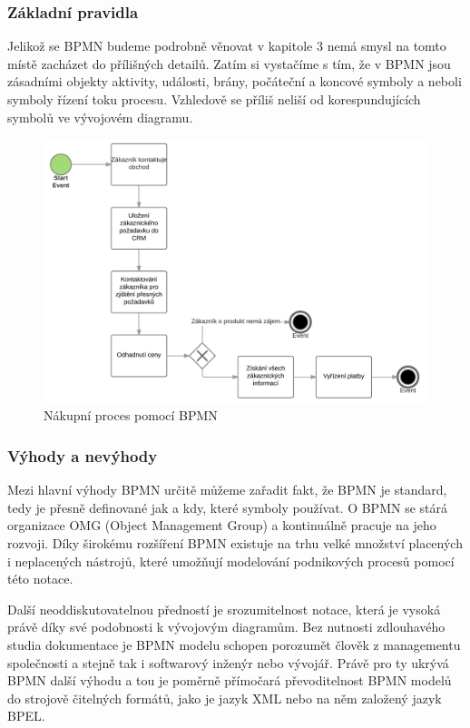 \documentclass[]{article}
\begin{document}
\subsubsection{Základní pravidla}
Jelikož se BPMN budeme podrobně věnovat v kapitole 3 %
nemá smysl na tomto místě zacházet do přílišných detailů. Zatím si vystačíme s tím, že v BPMN jsou zásadními objekty aktivity, události, brány, počáteční a koncové symboly a  neboli symboly řízení toku procesu. Vzhledově se příliš neliší od korespundujících symbolů ve vývojovém diagramu.

\begin{figure}[H]\centering %
\includegraphics[width=1.0\textwidth]{obrazky/bpmn_nakupniproces}
\caption{Nákupní proces pomocí BPMN}
\label{fig:BPMN_nakupniproces}
\end{figure}

\subsubsection{Výhody a nevýhody}
Mezi hlavní výhody BPMN určitě můžeme zařadit fakt, že BPMN je standard, tedy je přesně definované jak a kdy, které symboly používat. O BPMN se stárá organizace OMG (Object Management Group) a kontinuálně pracuje na jeho rozvoji. Díky širokému rozšíření BPMN existuje na trhu velké množství placených i neplacených nástrojů, které umožňují modelování podnikových procesů pomocí této notace.

Další neoddiskutovatelnou předností je srozumitelnost notace, která je vysoká právě díky své podobnosti k vývojovým diagramům. Bez nutnosti zdlouhavého studia dokumentace je BPMN modelu schopen porozumět člověk z managementu společnosti a stejně tak i softwarový inženýr nebo vývojář. Právě pro ty ukrývá BPMN další výhodu a tou je poměrně přímočará převoditelnost BPMN modelů do strojově čitelných formátů, jako je jazyk XML nebo na něm založený jazyk BPEL. %
\end{document}
